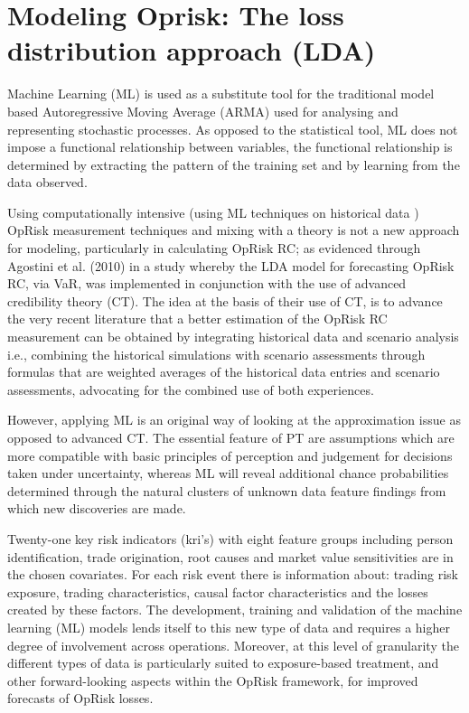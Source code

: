\documentclass{DissertateUSU}
\begin{document}
\section{Modeling Oprisk: The loss distribution approach (LDA)}
\label{sec:Modeling Oprisk: The loss distribution approach (LDA)}

Machine Learning (ML) is used as a substitute tool for the traditional
model based Autoregressive Moving Average (ARMA) used for analysing and
representing stochastic processes. As opposed to the statistical tool,
ML does not impose a functional relationship between variables, the
functional relationship is determined by extracting the pattern of the
training set and by learning from the data observed.\medskip 

Using computationally intensive (using ML techniques on historical data
) OpRisk measurement techniques and mixing with a theory is not a new
approach for modeling, particularly in calculating OpRisk RC; as
evidenced through Agostini et al. (2010) in a study whereby the LDA
model for forecasting OpRisk RC, via VaR, was implemented in conjunction
with the use of advanced credibility theory (CT). The idea at the basis
of their use of CT, is to advance the very recent literature that a
better estimation of the OpRisk RC measurement can be obtained by
integrating historical data and scenario analysis i.e., combining the
historical simulations with scenario assessments through formulas that
are weighted averages of the historical data entries and scenario
assessments, advocating for the combined use of both
experiences.\medskip 

However, applying ML is an original way of looking at the approximation
issue as opposed to advanced CT. The essential feature of PT are
assumptions which are more compatible with basic principles of
perception and judgement for decisions taken under uncertainty, whereas
ML will reveal additional chance probabilities determined through the
natural clusters of unknown data feature findings from which new
discoveries are made.\medskip

Twenty-one key risk indicators (kri's) with eight feature groups
including person identification, trade origination, root causes and
market value sensitivities are in the chosen covariates. For each risk
event there is information about: trading risk exposure, trading
characteristics, causal factor characteristics and the losses created by
these factors. The development, training and validation of the machine
learning (ML) models lends itself to this new type of data and requires
a higher degree of involvement across operations. Moreover, at this
level of granularity the different types of data is particularly suited
to exposure-based treatment, and other forward-looking aspects within
the OpRisk framework, for improved forecasts of OpRisk losses.\medskip
\end{document}

